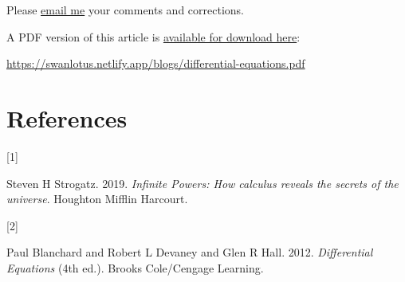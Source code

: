 \documentclass[
  a4paper,
]{article}
\newlength{\cslhangindent}
\newlength{\csllabelwidth}
\newenvironment{CSLReferences}[2] %
 {\begin{list}{}{%
  \setlength{\itemindent}{0pt}
  \setlength{\leftmargin}{0pt}
  \setlength{\parsep}{0pt}
  \ifodd #1
   \setlength{\leftmargin}{\cslhangindent}
   \setlength{\itemindent}{-1\cslhangindent}
  \fi
  \setlength{\itemsep}{#2\baselineskip}}}
 {\end{list}}
\newcommand{\CSLLeftMargin}[1]{\parbox[t]{\csllabelwidth}{\strut#1\strut}}
\newcommand{\CSLRightInline}[1]{\parbox[t]{\linewidth - \csllabelwidth}{\strut#1\strut}}
\begin{document}
Please \href{mailto:feedback.swanlotus@gmail.com}{email me} your
comments and corrections.

\noindent A PDF version of this article is
\href{./differetial-equations.pdf}{available for download here}:

\begin{sffamily}

\url{https://swanlotus.netlify.app/blogs/differential-equations.pdf}

\end{sffamily}

\section*{References}\label{bibliography}

\label{refs}
\begin{CSLReferences}{0}{0}
\CSLLeftMargin{{[}1{]} }%
\CSLRightInline{Steven H Strogatz. 2019. \emph{{Infinite Powers}: {How
calculus reveals the secrets of the universe}}. Houghton Mifflin
Harcourt.}

\CSLLeftMargin{{[}2{]} }%
\CSLRightInline{Paul Blanchard and Robert L Devaney and Glen R Hall.
2012. \emph{{Differential Equations}} (4th ed.). Brooks Cole/Cengage
Learning.}

\end{CSLReferences}
\end{document}
